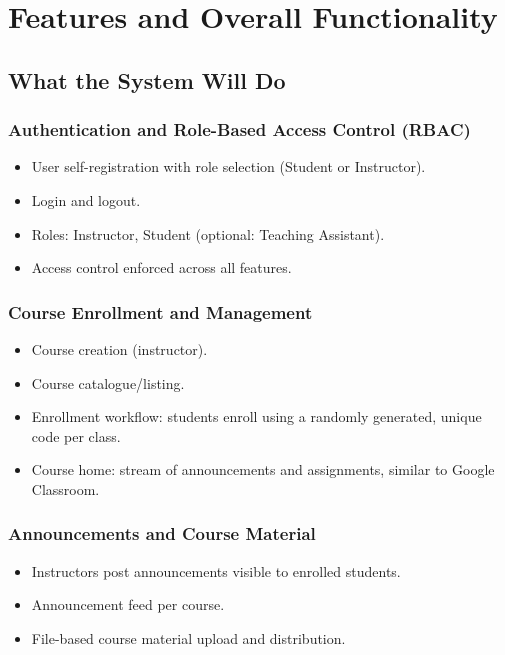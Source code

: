 \documentclass[12pt, a4paper]{article}
\begin{document}
\section{Features and Overall Functionality}

\subsection{What the System Will Do}

\subsubsection{Authentication and Role-Based Access Control (RBAC)}
\begin{itemize}
  \item User self-registration with role selection (Student or Instructor).
  \item Login and logout.
  \item Roles: Instructor, Student (optional: Teaching Assistant).
  \item Access control enforced across all features.
\end{itemize}

\subsubsection{Course Enrollment and Management}
\begin{itemize}
  \item Course creation (instructor).
  \item Course catalogue/listing.
  \item Enrollment workflow: students enroll using a randomly generated,
        unique code per class.
  \item Course home: stream of announcements and assignments, similar to
        Google Classroom.
\end{itemize}

\subsubsection{Announcements and Course Material}
\begin{itemize}
  \item Instructors post announcements visible to enrolled students.
  \item Announcement feed per course.
  \item File-based course material upload and distribution.
\end{itemize}
\end{document}
